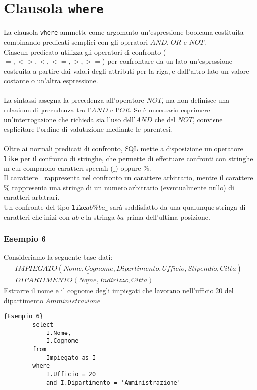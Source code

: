 \section{Clausola \texttt{where}}
La clausola \texttt{where} ammette come argomento un'espressione booleana costituita combinando predicati semplici con gli operatori $AND$, $OR$ e $NOT$.\\
Ciascun predicato utilizza gli operatori di confronto ($=, <>, <, <=, >, >=$) per confrontare da un lato un'espressione costruita a partire dai valori degli attributi per la riga, e dall'altro lato un valore costante o un'altra espressione.\\\\
La sintassi assegna la precedenza all'operatore $NOT$, ma non definisce una relazione di precedenza tra l'$AND$ e l'$OR$. Se è necessario esprimere un'interrogazione che richieda sia l'uso dell'$AND$ che del $NOT$, conviene esplicitare l'ordine di valutazione mediante le parentesi.\\\\
Oltre ai normali predicati di confronto, SQL mette a disposizione un operatore \texttt{like} per il confronto di stringhe, che permette di effettuare confronti con stringhe in cui compaiono caratteri speciali ($\_$) oppure $\%$.\\
Il carattere $\_$ rappresenta nel confronto un carattere arbitrario, mentre il carattere $\%$ rappresenta una stringa di un numero arbitrario (eventualmente nullo) di caratteri arbitrari.\\
Un confronto del tipo $\texttt{like} ab\%ba\_$ sarà soddisfatto da una qualunque stringa di caratteri che inizi con $ab$ e la stringa $ba$ prima dell'ultima posizione.

\subsubsection{Esempio 6}
Consideriamo la seguente base dati:
    \begin{equation}\begin{aligned}
        IMPIEGATO (\underline{Nome, Cognome}, Dipartimento, Ufficio, Stipendio, Citta)\\
        DIPARTIMENTO (\underline{Nome}, Indirizzo, Citta)
    \end{aligned}\end{equation}
Estrarre il nome e il cognome degli impiegati che lavorano nell'ufficio 20 del dipartimento $Amministrazione$
    \begin{lstlisting}{Esempio 6}
        select 
            I.Nome, 
            I.Cognome
        from 
            Impiegato as I
        where 
            I.Ufficio = 20
            and I.Dipartimento = 'Amministrazione'
    \end{lstlisting}
    
